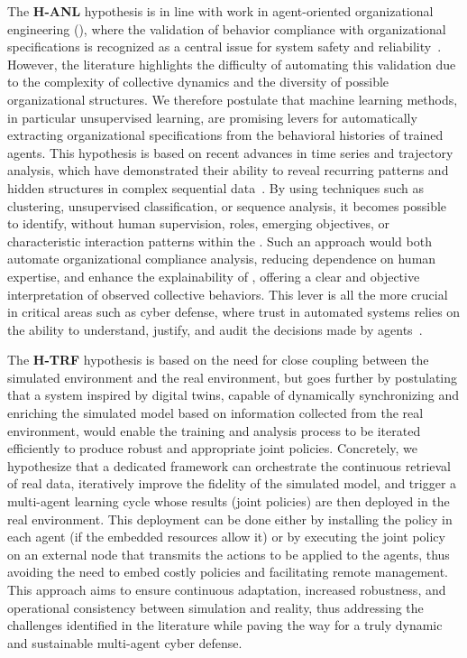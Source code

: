 \noindent The \textbf{H-ANL} hypothesis is in line with work in agent-oriented organizational engineering (), where the validation of behavior compliance with organizational specifications is recognized as a central issue for system safety and reliability~\cite{Boella2006, Picard2009reorganisation}. However, the literature highlights the difficulty of automating this validation due to the complexity of collective dynamics and the diversity of possible organizational structures. We therefore postulate that machine learning methods, in particular unsupervised learning, are promising levers for automatically extracting organizational specifications from the behavioral histories of trained agents. This hypothesis is based on recent advances in time series and trajectory analysis, which have demonstrated their ability to reveal recurring patterns and hidden structures in complex sequential data~\cite{Zhang2021, Gunning2019}. By using techniques such as clustering, unsupervised classification, or sequence analysis, it becomes possible to identify, without human supervision, roles, emerging objectives, or characteristic interaction patterns within the . Such an approach would both automate organizational compliance analysis, reducing dependence on human expertise, and enhance the explainability of , offering a clear and objective interpretation of observed collective behaviors. This lever is all the more crucial in critical areas such as cyber defense, where trust in automated systems relies on the ability to understand, justify, and audit the decisions made by agents~\cite{Gunning2019}.

\medskip

\noindent The \textbf{H-TRF} hypothesis is based on the need for close coupling between the simulated environment and the real environment, but goes further by postulating that a system inspired by digital twins, capable of dynamically synchronizing and enriching the simulated model based on information collected from the real environment, would enable the training and analysis process to be iterated efficiently to produce robust and appropriate joint policies. Concretely, we hypothesize that a dedicated framework can orchestrate the continuous retrieval of real data, iteratively improve the fidelity of the simulated model, and trigger a multi-agent learning cycle whose results (joint policies) are then deployed in the real environment. This deployment can be done either by installing the policy in each agent (if the embedded resources allow it) or by executing the joint policy on an external node that transmits the actions to be applied to the agents, thus avoiding the need to embed costly policies and facilitating remote management. This approach aims to ensure continuous adaptation, increased robustness, and operational consistency between simulation and reality, thus addressing the challenges identified in the literature while paving the way for a truly dynamic and sustainable multi-agent cyber defense.



